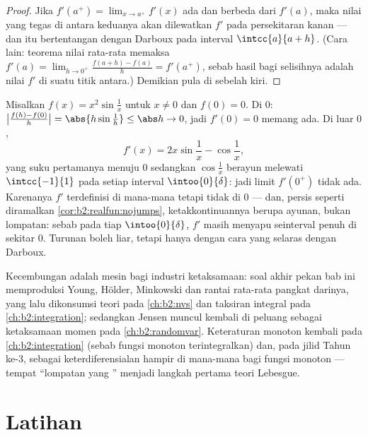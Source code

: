 \begin{proof}
Jika $f'(a^+) = \lim_{x\to a^+} f'(x)$ ada dan berbeda dari
$f'(a)$, maka nilai yang tegas di antara keduanya akan dilewatkan $f'$
pada persekitaran kanan --- dan itu bertentangan dengan Darboux pada
interval $\intcc{a}{a + h}$. (Cara lain: teorema nilai rata-rata memaksa
$f'(a) = \lim_{h\to0^+} \frac{f(a+h)-f(a)}{h} = f'(a^+)$, sebab hasil
bagi selisihnya adalah nilai $f'$ di suatu titik antara.)
Demikian pula di sebelah kiri.
\end{proof}

\begin{example}\label{ex:b2:realfun:oscillation}
Misalkan $f(x) = x^2\sin\frac1x$ untuk $x \neq 0$ dan $f(0) = 0$. Di
$0$: $\bigl|\frac{f(h) - f(0)}{h}\bigr| = \abs{h\sin\frac1h}
\leq \abs h \to 0$, jadi $f'(0) = 0$ memang ada. Di luar $0$,
\[
f'(x) = 2x\sin\frac1x - \cos\frac1x ,
\]
yang suku pertamanya menuju $0$ sedangkan $\cos\frac1x$ berayun
melewati $\intcc{-1}{1}$ pada setiap interval $\intoo{0}{\delta}$: jadi
limit $f'(0^+)$ tidak ada. Karenanya $f'$ terdefinisi di mana-mana tetapi
tidak  di $0$ --- dan, persis seperti diramalkan
\cref{cor:b2:realfun:nojumps}, ketakkontinuannya berupa
ayunan, bukan lompatan: sebab pada tiap $\intoo{0}{\delta}$, $f'$ masih
menyapu seinterval penuh di sekitar $0$. Turunan boleh liar, tetapi
hanya dengan cara yang selaras dengan Darboux.
\end{example}

\begin{remark}
Kecembungan adalah mesin bagi industri ketaksamaan: soal akhir pekan
bab ini memproduksi Young, Hölder, Minkowski
dan rantai rata-rata pangkat darinya, yang lalu dikonsumsi teori 
pada \cref{ch:b2:nvs} dan taksiran integral pada \cref{ch:b2:integration};
sedangkan Jensen muncul kembali di peluang sebagai ketaksamaan momen pada
\cref{ch:b2:randomvar}. Keteraturan monoton kembali pada
\cref{ch:b2:integration} (sebab fungsi monoton terintegralkan) dan,
pada jilid Tahun ke-3, sebagai keterdiferensialan hampir di mana-mana
bagi fungsi monoton --- tempat ``lompatan yang '' menjadi
langkah pertama teori Lebesgue.
\end{remark}

\section{Latihan}


